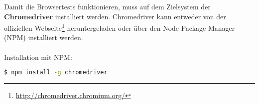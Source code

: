 Damit die Browsertests funktionieren, muss auf dem Zielsystem der
\textbf{Chromedriver} installiert werden. Chromedriver kann entweder von der
offiziellen Webseite\footnote{\url{http://chromedriver.chromium.org/}}
heruntergeladen oder über den Node Package Manager (NPM) installiert werden.\\
\\
Installation mit NPM:

\begin{lstlisting}[language=bash,frame=single]
$ npm install -g chromedriver
\end{lstlisting}

